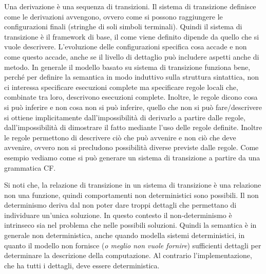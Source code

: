 \documentclass[oneside,a4paper,11pt]{book}
\theoremstyle{italicstyle}
\theoremstyle{normStyle}
\begin{document}
Una derivazione è una sequenza di transizioni. Il sistema di transizione
definisce come le derivazioni avvengono, ovvero come si possono raggiungere
le configurazioni finali (stringhe di soli simboli terminali).
Quindi il sistema di transizione è il framework di base, il come viene definito
dipende da quello che si vuole descrivere. L’evoluzione delle configurazioni
specifica cosa accade e non come questo accade, anche se il livello di
dettaglio può includere aspetti anche di metodo. In generale il modello
basato su sistema di transizione funziona bene, perché per definire la
semantica in modo induttivo sulla struttura sintattica, non ci interessa
specificare esecuzioni complete ma specificare regole locali che, combinate
tra loro, descrivono esecuzioni complete. Inoltre, le regole dicono cosa si
può inferire e non cosa non si può inferire, quello che non si può fare/descrivere
si ottiene implicitamente dall'impossibilità di derivarlo a partire dalle regole,
dall'impossibilità di dimostrare il fatto mediante l’uso delle regole definite.
Inoltre le regole permettono di descrivere ciò che può avvenire e non ciò che
deve avvenire, ovvero non si precludono possibilità diverse previste dalle regole.
Come esempio vediamo come si può generare un sistema di transizione a partire da
una grammatica CF. 

Si noti che, la relazione di transizione in un sistema di transizione è una relazione
non una funzione, quindi comportamenti non deterministici sono possibili.
Il non determinismo deriva dal non poter dare troppi dettagli che permettano
di individuare un’unica soluzione. In questo contesto il non-determinismo è
intrinseco sia nel problema che nelle possibili soluzioni. Quindi la semantica
è in generale non deterministica, anche quando modella sistemi deterministici,
in quanto il modello non fornisce (\textit{o meglio non vuole fornire}) sufficienti dettagli
per determinare la descrizione della computazione. Al contrario l’implementazione,
che ha tutti i dettagli, deve essere deterministica.
\end{document}
